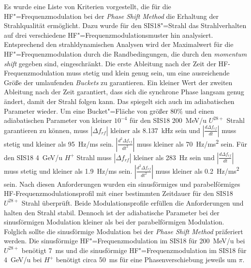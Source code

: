 Es wurde eine Liste von Kriterien vorgestellt, die f\"ur die HF"=Frequenzmodulation bei der \textit{Phase Shift Method} die Erhaltung der Strahlqualit\"at erm\"oglicht. Dazu wurde f\"ur den SIS18"=Strahl das Strahlverhalten auf drei verschiedene HF"=Frequenzmodulationsmuster hin analysiert. Entsprechend den strahldynamischen Analysen wird der Maximalwert f\"ur die HF"=Frequenzmodulation durch die Randbedingungen, die durch den \textit{momentum shift} gegeben sind, eingeschr\"ankt. Die erste Ableitung nach der Zeit der HF-Frequenzmodulation muss stetig und klein genug sein, um eine ausreichende Gr\"oße der umlaufenden \textit{Buckets}  zu garantieren. Ein kleiner Wert der zweiten Ableitung nach der Zeit garantiert,  dass sich die synchrone Phase langsam genug ändert, damit der Strahl folgen kann. Das spiegelt sich auch im adiabatischen Parameter wieder. Um eine Bucket"=Fl\"ache von größer 80$\%$  und einen adiabatischen Parameter von kleiner $10^{-4}$ f\"ur den SIS18 \SI{200}{MeV/u} $U^\mathit{28+}$ Strahl garantieren zu k\"onnen, muss $|\Delta f_{\mathit{rf}}|$ kleiner als \SI{8.137}{kHz} sein und $|\frac{d\Delta f_{\mathit{rf}}}{dt}|$ muss stetig und kleiner als \SI{95}{Hz/ms} sein. $|\frac{d^2\Delta f_{\mathit{rf}}}{dt^2}|$ muss kleiner als \SI{70}{Hz/ms^2} sein. Für den SIS18 \SI{4}{GeV/u} $H^{+}$ Strahl muss $|\Delta f_{\mathit{rf}}|$ kleiner als \SI{283}{Hz} sein und $|\frac{d\Delta f_{\mathit{rf}}}{dt}|$ muss stetig und kleiner als \SI{1.9}{Hz/ms} sein. $|\frac{d^2\Delta f_{\mathit{rf}}}{dt^2}|$ muss kleiner als \SI{0.2}{Hz/ms^2} sein. Nach diesen Anforderungen wurden ein sinusförmiges und parabelförmiges HF-Frequenzmodulationsprofil mit einer bestimmten Zeitdauer f\"ur den SIS18 $U^{28+}$ Strahl \"uberpr\"uft. Beide Modulationsprofile erfüllen die Anforderungen und halten den Strahl stabil. Dennoch ist der adiabatische Parameter bei der sinusf\"ormigen Modulation kleiner als bei der parabelförmigen Modulation. Folglich sollte die sinusförmige Modulation bei der \textit{Phase Shift Method} pr\"aferiert werden. Die sinusf\"ormige HF"=Frequenzmodulation im SIS18 f\"ur
\SI{200}{MeV/u} bei $U^\mathit{28+}$ ben\"otigt \SI{7}{\ms} und die sinusf\"ormige HF"=Frequenzmodulation im SIS18 f\"ur \SI{4}{GeV/u} bei $H^+$ ben\"otigt circa \SI{50}{\ms} f\"ur eine Phasenverschiebung jeweils um $\pi$.   

